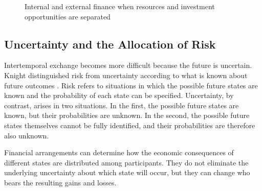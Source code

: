 \begin{figure}[H]

\caption{Internal and external finance when resources and investment opportunities are separated}
\label{fig:ch1-internal-external-finance}
\end{figure}


\subsection{Uncertainty and the Allocation of Risk}

Intertemporal exchange becomes more difficult because the future is uncertain. Knight distinguished risk from uncertainty according to what is known about future outcomes \cite{Knight1921}. Risk refers to situations in which the possible future states are known and the probability of each state can be specified. Uncertainty, by contrast, arises in two situations. In the first, the possible future states are known, but their probabilities are unknown. In the second, the possible future states themselves cannot be fully identified, and their probabilities are therefore also unknown.

Financial arrangements can determine how the economic consequences of different states are distributed among participants. They do not eliminate the underlying uncertainty about which state will occur, but they can change who bears the resulting gains and losses.

